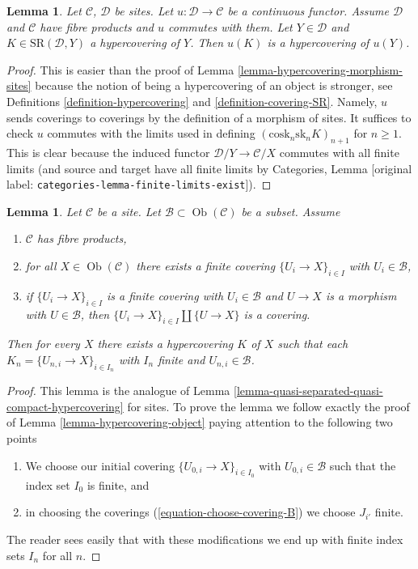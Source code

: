 \documentclass[10pt,a4paper]{article}
\theoremstyle{plain}
\newtheorem{lemma}[subsection]{Lemma}
\theoremstyle{definition}
\theoremstyle{remark}
\numberwithin{equation}{subsection}
\def\Ob{\mathop{\mathrm{Ob}}\nolimits}
\begin{document}
\begin{lemma}
\label{lemma-hypercovering-continuous-functor}
Let $\mathcal{C}$, $\mathcal{D}$ be sites. Let
$u : \mathcal{D} \to \mathcal{C}$ be a continuous functor.
Assume $\mathcal{D}$ and $\mathcal{C}$ have fibre products
and $u$ commutes with them. Let $Y \in \mathcal{D}$ and
$K \in \text{SR}(\mathcal{D}, Y)$ a hypercovering of $Y$.
Then $u(K)$ is a hypercovering of $u(Y)$.
\end{lemma}

\begin{proof}
This is easier than the proof of Lemma \ref{lemma-hypercovering-morphism-sites}
because the notion of being a hypercovering of an object is stronger, see
Definitions \ref{definition-hypercovering} and \ref{definition-covering-SR}.
Namely, $u$ sends coverings to coverings by the definition of
a morphism of sites. It suffices to check $u$ commutes with the
limits used in defining
$(\text{cosk}_n \text{sk}_n K)_{n + 1}$ for $n \geq 1$.
This is clear because the induced functor
$\mathcal{D}/Y \to \mathcal{C}/X$ commutes with all finite limits
(and source and target have all finite limits by
Categories, Lemma \textnormal{[original label: \nolinkurl{categories-lemma-finite-limits-exist}]}).
\end{proof}

\begin{lemma}
\label{lemma-w-contractible}
Let $\mathcal{C}$ be a site. Let $\mathcal{B} \subset \Ob(\mathcal{C})$
be a subset. Assume
\begin{enumerate}
\item $\mathcal{C}$ has fibre products,
\item for all $X \in \Ob(\mathcal{C})$ there exists a finite covering
$\{U_i \to X\}_{i \in I}$ with $U_i \in \mathcal{B}$,
\item if $\{U_i \to X\}_{i \in I}$ is a finite covering with
$U_i \in \mathcal{B}$ and $U \to X$ is a morphism with $U \in \mathcal{B}$,
then $\{U_i \to X\}_{i \in I} \amalg \{U \to X\}$ is a covering.
\end{enumerate}
Then for every $X$ there exists a hypercovering $K$ of $X$
such that each $K_n = \{U_{n, i} \to X\}_{i \in I_n}$ with
$I_n$ finite and $U_{n, i} \in \mathcal{B}$.
\end{lemma}

\begin{proof}
This lemma is the analogue of
Lemma \ref{lemma-quasi-separated-quasi-compact-hypercovering}
for sites. To prove the lemma we follow exactly the proof of
Lemma \ref{lemma-hypercovering-object}
paying attention to the following two points
\begin{enumerate}
\item[(a)] We choose our initial covering $\{U_{0, i} \to X\}_{i \in I_0}$
with $U_{0, i} \in \mathcal{B}$ such that the index set $I_0$ is finite, and
\item[(b)] in choosing the coverings
(\ref{equation-choose-covering-B})
we choose $J_{i'}$ finite.
\end{enumerate}
The reader sees easily that with these modifications we end up
with finite index sets $I_n$ for all $n$.
\end{proof}
\end{document}
